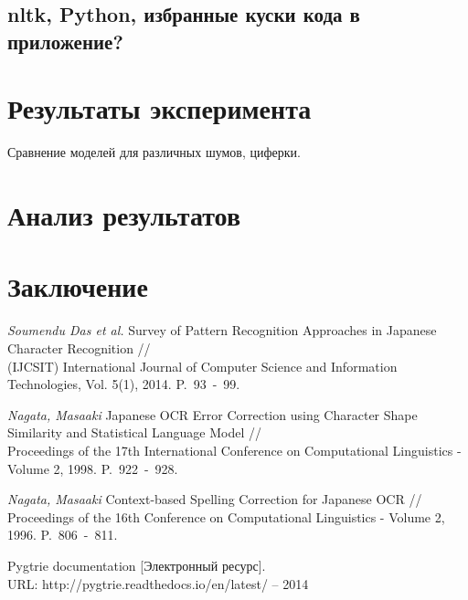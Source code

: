 \documentclass[14pt,russian]{extreport}
\theoremstyle{definition}
\begin{document}
\subsection{ nltk, Python, избранные куски кода в приложение? }

\newpage
\section{ Результаты эксперимента }\label{sec:results}

Сравнение моделей для различных шумов, циферки.

\newpage
\section{ Анализ результатов }\label{sec:analysis}

\newpage
\section{ Заключение }\label{sec:epilogue}

\newpage
{}
\begin{thebibliography}{00}
	
\textit{Soumendu Das et al.} Survey of Pattern Recognition Approaches in Japanese Character Recognition //\\
(IJCSIT) International Journal of Computer Science and Information Technologies, Vol. 5(1), 2014. P.~93~-~99.

\textit{Nagata, Masaaki} Japanese OCR Error Correction using Character Shape Similarity and Statistical Language Model //\\
Proceedings of the 17th International Conference on Computational Linguistics - Volume 2, 1998. P.~922~-~928.

\textit{Nagata, Masaaki} Context-based Spelling Correction for Japanese OCR //\\
Proceedings of the 16th Conference on Computational Linguistics - Volume 2, 1996. P.~806~-~811.

 Pygtrie documentation [Электронный ресурс]. \\ URL: http://pygtrie.readthedocs.io/en/latest/ -- 2014

\end{thebibliography}
\end{document}
